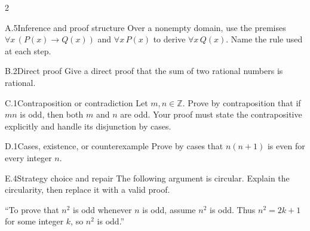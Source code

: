 \documentclass[9pt]{extarticle}
\begin{document}
\begin{multicols}{2}
\begin{CoreProblem}{A.5}{Inference and proof structure}
Over a nonempty domain, use the premises
$\forall x\,(P(x)\to Q(x))$ and $\forall x\,P(x)$ to derive
$\forall x\,Q(x)$. Name the rule used at each step.
\end{CoreProblem}
\begin{CoreProblem}{B.2}{Direct proof}
Give a direct proof that the sum of two rational numbers is rational.
\end{CoreProblem}
\begin{CoreProblem}{C.1}{Contraposition or contradiction}
Let $m,n\in\mathbb Z$. Prove by contraposition that if $mn$ is odd, then both
$m$ and $n$ are odd. Your proof must state the contrapositive explicitly and
handle its disjunction by cases.
\end{CoreProblem}
\columnbreak
\begin{CoreProblem}{D.1}{Cases, existence, or counterexample}
Prove by cases that $n(n+1)$ is even for every integer $n$.
\end{CoreProblem}
\begin{CoreProblem}{E.4}{Strategy choice and repair}
The following argument is circular. Explain the circularity, then replace it with a valid proof.

``To prove that $n^2$ is odd whenever $n$ is odd, assume $n^2$ is odd. Thus
$n^2=2k+1$ for some integer $k$, so $n^2$ is odd.''
\end{CoreProblem}
\end{multicols}
\CoreWorkArea
\FormBreak
{}
\end{document}
